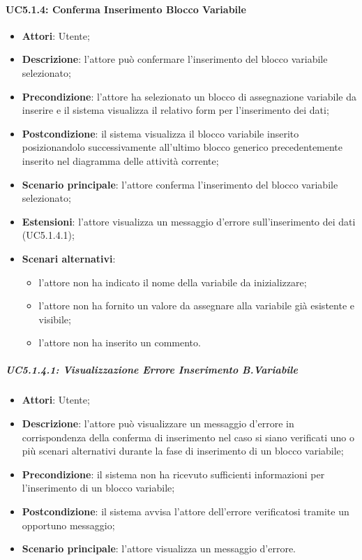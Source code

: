 \paragraph{UC5.1.4: Conferma Inserimento Blocco Variabile}
\label{UC5.1.4}
\begin{itemize}
\item \textbf{Attori}: Utente;
\item \textbf{Descrizione}: l'attore può confermare l'inserimento del blocco variabile selezionato;	
\item \textbf{Precondizione}: l'attore ha selezionato un blocco di assegnazione variabile da inserire e il sistema visualizza il relativo form per l'inserimento dei dati;
\item \textbf{Postcondizione}: il sistema visualizza il blocco variabile inserito posizionandolo successivamente all'ultimo blocco generico precedentemente inserito nel diagramma delle attività corrente;	
\item \textbf{Scenario principale}:
l'attore conferma l'inserimento del blocco variabile selezionato;	
\item \textbf{Estensioni}:
l'attore visualizza un messaggio d'errore sull'inserimento dei dati (UC5.1.4.1);	
\item \textbf{Scenari alternativi}:
\begin{itemize}
\item l'attore non ha indicato il nome della variabile da inizializzare;
\item l'attore non ha fornito un valore da assegnare alla variabile già esistente e visibile;
\item l'attore non ha inserito un commento.	
\end{itemize}
\end{itemize}

\subparagraph{UC5.1.4.1: Visualizzazione Errore Inserimento B.Variabile	}
\label{UC5.1.4.1}
\begin{itemize}
\item \textbf{Attori}: Utente;
\item \textbf{Descrizione}: l'attore può visualizzare un messaggio d'errore in corrispondenza della conferma di inserimento nel caso si siano verificati uno o più scenari alternativi durante la fase di inserimento di un blocco variabile;	
\item \textbf{Precondizione}: il sistema non ha ricevuto sufficienti informazioni per l'inserimento di un blocco variabile;	
\item \textbf{Postcondizione}: il sistema avvisa l'attore dell'errore verificatosi tramite un opportuno messaggio;	
\item \textbf{Scenario principale}:
l'attore visualizza un messaggio d'errore.	
\end{itemize}

